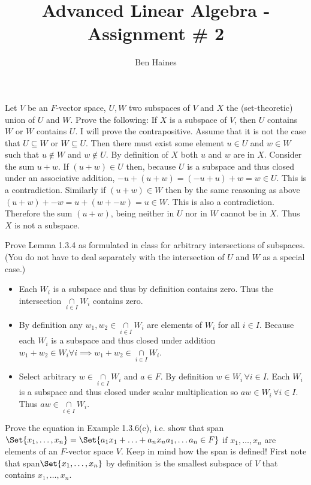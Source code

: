 \documentclass[paper=a4, fontsize=11pt]{jhwhw} %
\providecommand\given{} %
\begin{document}
\title{Advanced Linear Algebra - Assignment \# 2}
\author{Ben Haines}

Let $V$ be an $F$-vector space, $U, W$ two subspaces of $V$ and $X$ the (set-theoretic) union of $U$ and $W$.
Prove the following: If $X$ is a subspace of $V$, then $U$ contains $W$ or $W$ contains $U$.
\solution
I will prove the contrapositive. Assume that it is not the case that $U\subseteq W$ or $W\subseteq U$. Then there must exist some element $u\in U$ and $w\in W$ such that $u \not\in W$ and $w \not\in U$. By definition of $X$ both $u$ and $w$ are in $X$. Consider the sum $u + w$. If $(u + w) \in U$ then, because $U$ is a subspace and thus closed under an associative addition, $-u + (u + w) = (-u + u) + w = w \in U$. This is a contradiction. Similarly if $(u + w) \in W$ then by the same reasoning as above $(u + w) + -w = u + (w + -w) = u \in W$. This is also a contradiction. Therefore the sum $(u + w)$, being neither in $U$ nor in $W$ cannot be in $X$. Thus $X$ is not a subspace. 

Prove Lemma 1.3.4 as formulated in class for arbitrary intersections of subspaces.
(You do not have to deal separately with the intersection of $U$ and $W$ as a special case.)
\solution
\begin{itemize}
    \item
        Each $W_i$ is a subspace and thus by definition contains zero. Thus the intersection $\underset{i\in I}{\cap}W_i$ contains zero.
    \item
        By definition any $w_1, w_2\in \underset{i\in I}{\cap}W_i$ are elements of $W_i$ for all $i\in I$. Because each $W_i$ is a subspace and thus closed under addition $w_1 + w_2 \in W_i \forall i \implies w_1 + w_2 \in \underset{i\in I}{\cap}W_i$. 
    \item
        Select arbitrary $w \in \underset{i\in I}{\cap}W_i$ and $a\in F$. By definition $w \in W_i\, \forall i\in I$. Each $W_i$ is a subspace and thus closed under scalar multiplication so $aw \in W_i\, \forall i\in I$. Thus $aw \in \underset{i\in I}{\cap}W_i$. 
\end{itemize}

Prove the equation in Example 1.3.6(c), i.e. show that
span$\Set{x_1 , \ldots , x_n } = \Set{a_1x_1 + \ldots + a_nx_n \given a_1 , \ldots a_n \in F }$
if  $x_1, \ldots , x_n$ are elements of an $F$-vector space $V$. Keep in mind how the span is defined!
\solution
First note that span$\Set{x_1 , \ldots , x_n }$ by definition is the smallest subspace of $V$ that contains $x_1 , \ldots , x_n$.
\end{document}
